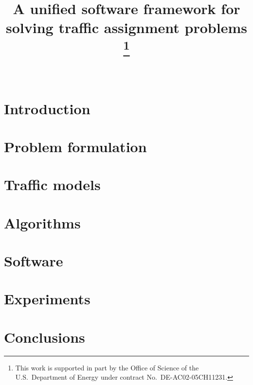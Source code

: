 \documentclass[conference]{IEEEtran}
\begin{document}
\title{A unified software framework for solving traffic assignment problems\\
\thanks{This work is supported in part by the Office of Science of the
 U.S.~Department of Energy under contract No.~DE-AC02-05CH11231.}
}
 
\author{\\
}

\maketitle


\begin{abstract}

\end{abstract}

\begin{IEEEkeywords}
\end{IEEEkeywords}

\section{Introduction}
\label{sec:intro}


\section{Problem formulation}
\label{sec:formulation}
 

\section{Traffic models}
\label{sec:models}


\section{Algorithms}
\label{sec:algorithms}


\section{Software}
\label{sec:software}


\section{Experiments}
\label{sec:experiments}


\section{Conclusions}
\label{sec:conclusions}





\end{document}
